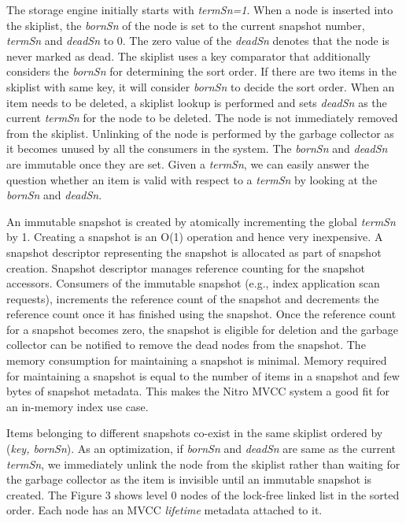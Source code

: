 \documentclass{vldb}
\begin{document}
The storage engine initially starts with \textit{termSn=1}. When a node is inserted into the skiplist, the \textit{bornSn} of the node is set to the current snapshot number, \textit{termSn} and \textit{deadSn} to 0. The zero value of the \textit{deadSn} denotes that the node is never marked as dead. The skiplist uses a key comparator that additionally considers the \textit{bornSn} for determining the sort order. If there are two items in the skiplist with same key, it will consider \textit{bornSn} to decide the sort order. When an item needs to be deleted, a skiplist lookup is performed and sets \textit{deadSn} as the current \textit{termSn} for the node to be deleted. The node is not immediately removed from the skiplist. Unlinking of the node is performed by the garbage collector as it becomes unused by all the consumers in the system. The \textit{bornSn} and \textit{deadSn} are immutable once they are set. Given a \textit{termSn}, we can easily answer the question whether an item is valid with respect to a \textit{termSn} by looking at the \textit{bornSn} and \textit{deadSn}.

An immutable snapshot is created by atomically incrementing the global \textit{termSn} by 1. Creating a snapshot is an O(1) operation and hence very inexpensive. A snapshot descriptor representing the snapshot is allocated as part of snapshot creation.  Snapshot descriptor manages reference counting for the snapshot accessors. Consumers of the immutable snapshot (e.g., index application scan requests), increments the reference count of the snapshot and decrements the reference count once it has finished using the snapshot. Once the reference count for a snapshot becomes zero, the snapshot is eligible for deletion and the garbage collector can be notified to remove the dead nodes from the snapshot. The memory consumption for maintaining a snapshot is minimal. Memory required for maintaining a snapshot is equal to the number of items in a snapshot and few bytes of snapshot metadata. This makes the Nitro MVCC system a good fit for an in-memory index use case.

Items belonging to different snapshots co-exist in the same skiplist ordered by (\textit{key, bornSn}). As an optimization, if \textit{bornSn} and \textit{deadSn} are same as the current \textit{termSn}, we immediately unlink the node from the skiplist rather than waiting for the garbage collector as the item is invisible until an immutable snapshot is created. The Figure 3 shows level 0 nodes of the lock-free linked list in the sorted order. Each node has an MVCC \textit{lifetime} metadata attached to it.
    
\end{document}
